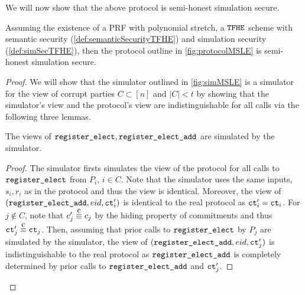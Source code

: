 \newcommand{\simCMSLE}{\texttt{Sim}_C}

We will now show that the above protocol is semi-honest simulation secure.

\begin{theorem}
	Assuming the existence of a PRF with polynomial stretch, a ${\texttt{TFHE}}$ scheme with semantic security (\cref{def:semanticSecurityTFHE}) and simulation security (\cref{def:simSecTFHE}),
	then the protocol outline in \cref{fig:protocolMSLE} is semi-honest simulation secure.
	\begin{proof}
		We will show that the simulator outlined in \cref{fig:simMSLE} is a simulator for the view of corrupt
		parties $C \subset [n]$ and $|C| < t$ by showing that the simulator's view and the protocol's view are indistinguishable for all calls
		via the following three lemmas.

		\begin{lemma}
			The views of $\texttt{register\_elect}, \texttt{register\_elect\_add}$ are simulated by the simulator.
			\begin{proof}
				The simulator firsts simulates the view of the protocol for all calls to $\texttt{register\_elect}$ from $P_i$, $i \in C$.
				Note that the simulator uses the same inputs, $s_i, r_i$ as in the protocol and thus the view is identical.
				Moreover, the view of $(\texttt{register\_elect\_add}, {eid}, \texttt{ct}'_i)$ is identical to the real protocol as $\texttt{ct}'_i = \texttt{ct}_i$.
				For $j \notin C$, note that $c'_j \compInd c_j$ by the hiding property of commitments and thus
				$\ct'_j \compInd \ct_j$.
				Then, assuming that prior calls to $\texttt{register\_elect}$ by $P_j$ are simulated by the simulator,
				the view of $(\texttt{register\_elect\_add}, {eid}, \texttt{ct}'_j)$ is indistinguishable to the real protocol as
				$\texttt{register\_elect\_add}$ is completely determined by prior calls to $\texttt{register\_elect\_add}$ and $\texttt{ct}'_j$.


\end{proof}
\end{lemma}
\end{proof}
\end{theorem}
